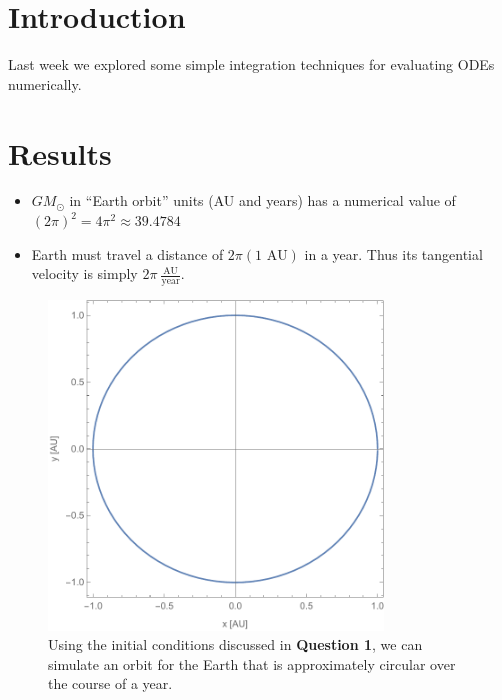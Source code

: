 \documentclass{article}
\author{\hwauthor}
\title{\hwtitle}
\date{\hwdate}
\begin{document}
\maketitle
\thispagestyle{fancy}

\section{Introduction}

Last week we explored some simple integration techniques for evaluating ODEs numerically.

\section{Results}

\bigskip
{}
\medskip

\begin{itemize}
    \item $GM_\odot$ in ``Earth orbit'' units (AU and years) has a numerical value of $(2\pi)^2=4\pi^2\approx39.4784$
    \item Earth must travel a distance of $2\pi(1 \text{ AU})$ in a year. Thus its tangential velocity is simply $2\pi\ \frac{\text{AU}}{\text{year}}$.
\end{itemize}

\bigskip
{}
\medskip

\begin{figure}[h!]
    \centering
    \includegraphics[width=3.5in]{homework3/q2_orbit.pdf}
    \caption{Using the initial conditions discussed in \textbf{Question 1}, we can simulate an orbit for the Earth that is approximately circular over the course of a year.}
    \label{fig:q2orbit}
\end{figure}
\end{document}
